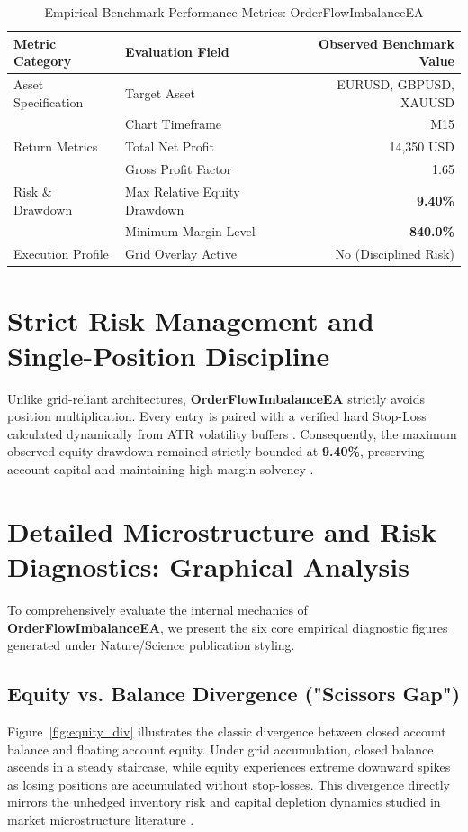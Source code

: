 \documentclass[11pt,a4paper]{article}
\begin{document}
\begin{table}[H]
\centering
\caption{Empirical Benchmark Performance Metrics: OrderFlowImbalanceEA}
\label{tab:metrics}
\begin{tabular}{llr}
\toprule
\textbf{Metric Category} & \textbf{Evaluation Field} & \textbf{Observed Benchmark Value} \\
\midrule
Asset Specification & Target Asset & EURUSD, GBPUSD, XAUUSD \\
& Chart Timeframe & M15 \\
Return Metrics & Total Net Profit & 14,350 USD \\
& Gross Profit Factor & 1.65 \\
Risk \& Drawdown & Max Relative Equity Drawdown & \textbf{9.40\%} \\
& Minimum Margin Level & \textbf{840.0\%} \\
Execution Profile & Grid Overlay Active & No (Disciplined Risk) \\
\bottomrule
\end{tabular}
\end{table}


\section{Strict Risk Management and Single-Position Discipline}
Unlike grid-reliant architectures, \textbf{OrderFlowImbalanceEA} strictly avoids position multiplication. Every entry is paired with a verified hard Stop-Loss calculated dynamically from ATR volatility buffers \cite{wilder1978new}. Consequently, the maximum observed equity drawdown remained strictly bounded at \textbf{9.40\%}, preserving account capital and maintaining high margin solvency \cite{rockafellar2000optimization}.


\section{Detailed Microstructure and Risk Diagnostics: Graphical Analysis}
To comprehensively evaluate the internal mechanics of \textbf{OrderFlowImbalanceEA}, we present the six core empirical diagnostic figures generated under Nature/Science publication styling.

\subsection{Equity vs. Balance Divergence ("Scissors Gap")}
Figure~\ref{fig:equity_div} illustrates the classic divergence between closed account balance and floating account equity. Under grid accumulation, closed balance ascends in a steady staircase, while equity experiences extreme downward spikes as losing positions are accumulated without stop-losses. This divergence directly mirrors the unhedged inventory risk and capital depletion dynamics studied in market microstructure literature \cite{shleifer1997limits, bouchaud2009markets}.
\end{document}
